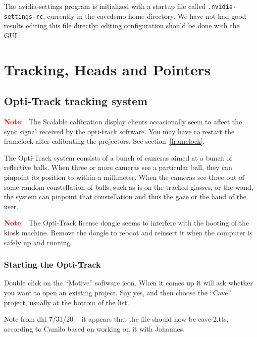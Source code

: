 \documentclass[11pt]{article}
\newenvironment{note}[1][Note]{\begin{lrbox}{\notebox}%
    \begin{minipage}{0.9\columnwidth}\textcolor{red}{\textbf{#1}:~}}%
    {\end{minipage}\end{lrbox}\begin{center}\setlength{\fboxsep}{8pt}%
    \fbox{\usebox{\notebox}}\end{center}}
\newcommand{\cmd}[1]{\texttt{#1}\xspace}
\newcommand{\menu}[1]{``#1''\xspace}
\begin{document}
The nvidia-settings program is initialized with a startup file called
\cmd{.nvidia-settings-rc}, currently in the cavedemo home
directory.  We have not had good results editing this file directly;
editing configuration should be done with the GUI.


\section{Tracking, Heads and Pointers}

\subsection{Opti-Track tracking system}
\label{opti-track}

\begin{note}
  The Scalable calibration display clients occasionally seem to affect
  the sync signal received by the opti-track software.  You may have
  to restart the framelock after calibrating the projectors.  See
  section~\ref{framelock}.
\end{note}

The Opti-Track system consists of a bunch of cameras aimed at a bunch
of reflective balls.  When three or more cameras see a particular
ball, they can pinpoint its position to within a millimeter.  When the
cameras see three out of some random constellation of balls, such as
is on the tracked glasses, or the wand, the system can pinpoint that
constellation and thus the gaze or the hand of the user.


\begin{note}
  The Opti-Track license dongle seems to interfere with the booting of
  the kiosk machine.  Remove the dongle to reboot and reinsert it when
  the computer is safely up and running.
\end{note}

\subsubsection{Starting the Opti-Track}

Double click on the ``Motive'' software icon.  When it comes up it
will ask whether you want to open an existing project.  Say yes, and
then choose the \menu{Cave} project, usually at the bottom of the
list.

Note from dhl 7/31/20 -- it appears that the file should now be
cave-2.tts, according to Camilo based on working on it with Johannes.
\end{document}
